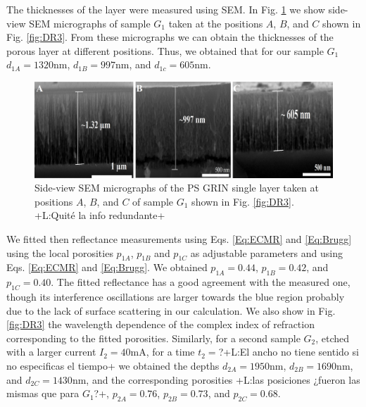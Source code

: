 \documentclass{article}
\newcommand{\notaL}[1]{{\color{blue}+L:#1+}}
\begin{document}
The thicknesses of the layer were measured
using SEM. In Fig. \ref{fig:DR4} we show side-view SEM micrographs of sample
$G_1$ taken at the
positions $A$, $B$, and $C$ shown in
Fig. \ref{fig:DR3}. From these micrographs we can
obtain the thicknesses of the porous layer at different
positions. Thus, we obtained that for our sample $G_1$
$d_{1A}= 1320\text{nm}$, $ d_{1B} = 997\text{nm}$, and $d_{1c} = 605
\text{nm}$.
\begin{figure}
  \centering
  \includegraphics[width=\textwidth]{Images/semD11}
  \caption{Side-view SEM micrographs of the PS GRIN single layer
    taken at positions $A$, $B$, and $C$ of sample $G_1$ shown in
    Fig. \ref{fig:DR3}.
    \notaL{Quité la info redundante}}
  \label{fig:DR4}
\end{figure}
We fitted then reflectance measurements using Eqs. \eqref{Eq:ECMR} and
\eqref{Eq:Brugg} using the local porosities $p_{1A}$, $p_{1B}$ and $p_{1C}$ as
adjustable parameters and using Eqs. \eqref{Eq:ECMR} and
\eqref{Eq:Brugg}. We obtained $p_{1A}=0.44$, $p_{1B}=0.42$, and
$p_{1C}= 0.40$. The fitted reflectance has a good agreement with the
measured one, though its interference oscillations are larger towards
the blue region probably due to the lack of surface scattering in our
calculation. We also show in Fig. \ref{fig:DR3} the wavelength dependence of
the complex index of refraction corresponding to the fitted porosities.
Similarly, for a second sample $G_2$, etched with a
larger current $I_2 =40 \text{mA}$, for a time $t_2=$?\notaL{El ancho no
  tiene sentido si no especificas el tiempo} we obtained the
depths $d_{2A}=1950\text{nm}$, $d_{2B}=1690\text{nm}$, and $d_{2C}=
1430\text{nm}$, and the corresponding porosities \notaL{las posiciones ¿fueron las mismas que para $G_1$?}, $p_{2A}= 0.76$, $p_{2B}=
0.73$, and $p_{2C}= 0.68$.
\end{document}
